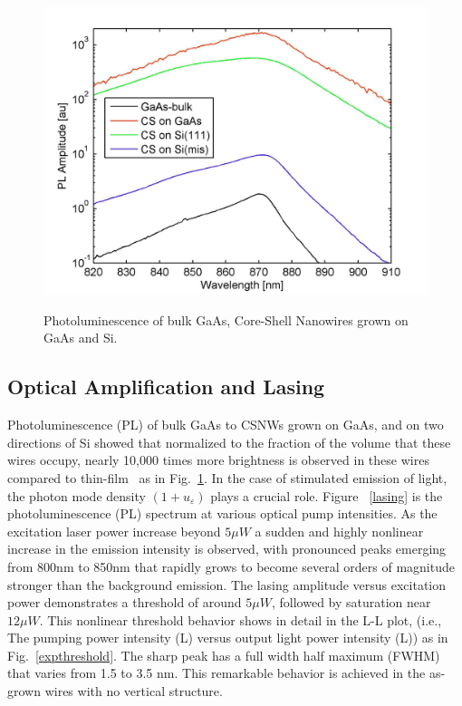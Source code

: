 \begin{figure}
  \caption{Photoluminescence of bulk GaAs, Core-Shell Nanowires grown on GaAs and Si.}
  \centering
  \includegraphics[width=\textwidth]{pictures/Data/PL}
  \label{PL}
\end{figure}

\subsection{Optical Amplification and Lasing} \label{data_lasing}

Photoluminescence (PL) of bulk GaAs to CSNWs grown on GaAs, and on two
directions of Si showed that normalized to the fraction of the volume that
these wires occupy, nearly 10,000 times more brightness is observed in these
wires compared to thin-film~\cite{Wang:2015bz} as in Fig.~\ref{PL}. In the case
of stimulated emission of light, the photon mode density $(1+u_\varepsilon)$
plays a crucial role. Figure ~\ref{lasing} is the photoluminescence (PL)
spectrum at various optical pump intensities. As the excitation laser power
increase beyond $5{\mu}W$ a sudden and highly nonlinear increase in the
emission intensity is observed, with pronounced peaks emerging from 800nm to
850nm that rapidly grows to become several orders of magnitude stronger than
the background emission.  The lasing amplitude versus excitation power
demonstrates a threshold of around $5{\mu}W$, followed by saturation near
$12{\mu}W$. This nonlinear threshold behavior shows in detail in the L-L plot,
(i.e., The pumping power intensity (L) versus output light power intensity (L))
as in Fig.~\ref{expthreshold}. The sharp peak has a full width half maximum
(FWHM) that varies from 1.5 to 3.5 nm.  This remarkable behavior is achieved in
the as-grown wires with no vertical structure.

